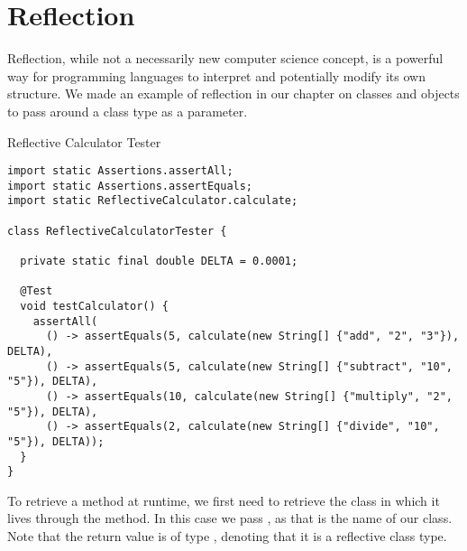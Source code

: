 \section{Reflection}

Reflection, while not a necessarily new computer science concept, is a powerful way for programming languages to interpret and potentially modify its own structure. We made an example of reflection in our chapter on classes and objects to pass around a class type as a parameter. 


\begin{cl}{Reflective Calculator Tester}
\begin{lstlisting}[language=MyJava]
import static Assertions.assertAll;
import static Assertions.assertEquals;
import static ReflectiveCalculator.calculate;

class ReflectiveCalculatorTester {

  private static final double DELTA = 0.0001;

  @Test
  void testCalculator() {
    assertAll(
      () -> assertEquals(5, calculate(new String[] {"add", "2", "3"}), DELTA),
      () -> assertEquals(5, calculate(new String[] {"subtract", "10", "5"}), DELTA),
      () -> assertEquals(10, calculate(new String[] {"multiply", "2", "5"}), DELTA),
      () -> assertEquals(2, calculate(new String[] {"divide", "10", "5"}), DELTA));
  }
}
\end{lstlisting}
\end{cl}

To retrieve a method at runtime, we first need to retrieve the class in which it lives through the  method. In this case we pass , as that is the name of our class. Note that the return value is of type , denoting that it is a reflective class type.

